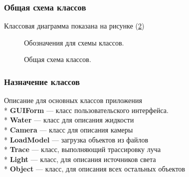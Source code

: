 \documentclass[14pt,a4paper]{extarticle}
\begin{document}
		\subsubsection*{Общая схема классов}
			Классовая диаграмма показана на рисунке (\ref{Class})		
			\begin{figure}[H]	
				\noindent{}
				\caption{Обозначения для схемы классов.}
				\label{legent}
			\end{figure}
			\begin{figure}[H]	
				\noindent{}
				\caption{Общая схема классов.}
				\label{Class}
			\end{figure}
		\subsubsection*{Назначение классов}
			Описание для основных классов приложения \\*
			\textbf{GUIForm} --- класс пользовательского интерфейса. \\*
			\textbf{Water} --- класс для описания жидкости \\*
			\textbf{Camera} --- класс для описания камеры \\*
			\textbf{LoadModel} --- загрузка объектов из файлов \\*
			\textbf{Trace} --- класс, выполняющий трассировку луча \\*
			\textbf{Light} --- класс, для описания источников света \\*
			\textbf{Object} --- класс, для описания всех остальных объектов
\end{document}
